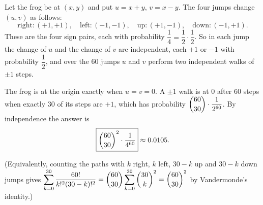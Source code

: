 Let the frog be at $(x,y)$ and put $u=x+y$, $v=x-y$. The four jumps change $(u,v)$ as follows:
\[\text{right}:(+1,+1),\quad\text{left}:(-1,-1),\quad\text{up}:(+1,-1),\quad\text{down}:(-1,+1).\]
These are the four sign pairs, each with probability $\dfrac14=\dfrac12\cdot\dfrac12$. So in each jump the change of $u$ and the change of $v$ are independent, each $+1$ or $-1$ with probability $\dfrac12$, and over the $60$ jumps $u$ and $v$ perform two independent walks of $\pm1$ steps.

The frog is at the origin exactly when $u=v=0$. A $\pm1$ walk is at $0$ after $60$ steps when exactly $30$ of its steps are $+1$, which has probability $\dbinom{60}{30}\cdot\dfrac{1}{2^{60}}$. By independence the answer is
\[\boxed{\dbinom{60}{30}^2\cdot\dfrac{1}{4^{60}}}\approx0.0105.\]

(Equivalently, counting the paths with $k$ right, $k$ left, $30-k$ up and $30-k$ down jumps gives $\displaystyle\sum_{k=0}^{30}\dfrac{60!}{k!^2(30-k)!^2}=\dbinom{60}{30}\sum_{k=0}^{30}\dbinom{30}{k}^2=\dbinom{60}{30}^2$ by Vandermonde's identity.)

